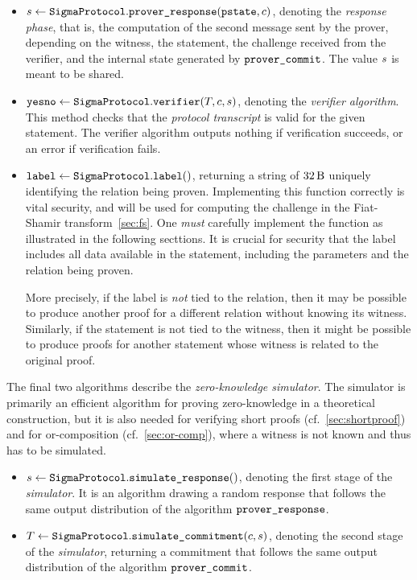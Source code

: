 \documentclass[11pt]{article}
\begin{document}
\begin{itemize}
        \item
          $s \gets \texttt{SigmaProtocol}.\texttt{prover\_response}(\texttt{pstate}, c)$,
          denoting the \emph{response phase}, that is, the computation of the second message sent by the prover, depending on the witness, the statement, the challenge received from the verifier, and the internal state generated by $\texttt{prover\_commit}$.
          The value $s$ is meant to be shared.
        \item $\texttt{yesno} \gets \texttt{SigmaProtocol}.\texttt{verifier}(T, c, s)$,
          denoting the \emph{verifier algorithm}. This method checks that
          the \emph{protocol transcript} is valid for the given statement.
          The verifier algorithm outputs nothing if verification succeeds,
          or an error if verification fails.
          \item $\texttt{label} \gets\texttt{SigmaProtocol}.\texttt{label}()$,
          returning a string of $\seedlen$ uniquely identifying the relation being proven.
          Implementing this function correctly is vital security, and will be used for computing the challenge in the Fiat-Shamir transform~\cref{sec:fs}.
          One \emph{must} carefully implement the function as illustrated in the following secttions. It is crucial for security that the label includes all data available in the statement, including the parameters and the relation being proven.

          More precisely, if the label is \emph{not} tied to the relation, then it may be possible to produce another proof for a different relation without knowing its witness.
          Similarly, if the statement is not tied to the witness, then it might be possible to produce proofs
          for another statement whose witness is related to the original proof.
      \end{itemize}
      The final two algorithms describe the \emph{zero-knowledge simulator}.
      The simulator is primarily an efficient algorithm for proving zero-knowledge in a theoretical construction, but it is also needed for verifying short proofs (cf.~\cref{sec:shortproof}) and for or-composition (cf.~\cref{sec:or-comp}), where a witness is not known and thus has to be simulated.
      \begin{itemize}
        \item $s \gets \texttt{SigmaProtocol}.\texttt{simulate\_response}()$,
        denoting the first stage of the \emph{simulator}. It is an algorithm drawing a random response that follows the same output distribution of the algorithm $\texttt{prover\_response}$.
        \item $T \gets \texttt{SigmaProtocol}.\texttt{simulate\_commitment}(c, s)$, denoting the second stage of the \emph{simulator}, returning a commitment that follows the same output distribution of the algorithm $\texttt{prover\_commit}$.
      \end{itemize}
\end{document}
